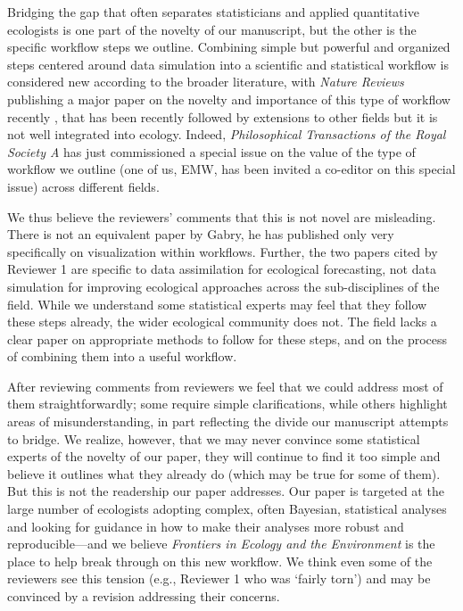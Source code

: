 \documentclass[11pt]{article}
\begin{document}
Bridging the gap that often separates statisticians and applied quantitative ecologists is one part of the novelty of our manuscript, but the other is the specific workflow steps we outline. Combining simple but powerful and organized steps centered around data simulation into a scientific and statistical workflow is considered new according to the broader literature, with \emph{Nature Reviews} publishing a major paper on the novelty and importance of this type of workflow recently \citep[this may be the Gelman publication Reviewer 3 mentions,][though the workflow we outline is distinct from this one co-authored by Gelman]{vandeschoot2021}, that has been recently followed by extensions to other fields \citep[for example in epidimeology, veterinary and cognitive sciences,][]{grinsztajn2021,schad2021,mielke2023workflow,hess2024bayesian} but it is not well integrated into ecology. Indeed, \emph{Philosophical Transactions of the Royal Society A} has just commissioned a special issue on the value of the type of workflow we outline (one of us, EMW, has been invited a co-editor on this special issue) across different fields. 

We thus believe the reviewers' comments that this is not novel are misleading. There is not an equivalent paper by Gabry, he has published only very specifically on visualization within workflows. Further, the two papers cited by Reviewer 1 are specific to data assimilation for ecological forecasting, not data simulation for improving ecological approaches across the sub-disciplines of the field. While we understand some statistical experts may feel that they follow these steps already, the wider ecological community does not. The field lacks a clear paper on appropriate methods to follow for these steps, and on the process of combining them into a useful workflow. 

After reviewing comments from reviewers we feel that we could address most of them straightforwardly; some require simple clarifications, while others highlight areas of misunderstanding, in part reflecting the divide our manuscript attempts to bridge. We realize, however, that we may never convince some statistical experts of the novelty of our paper, they will continue to find it too simple and believe it outlines what they already do (which may be true for some of them). But this is not the readership our paper addresses. Our paper is targeted at the large number of ecologists adopting complex, often Bayesian, statistical analyses and looking for guidance in how to make their analyses more robust and reproducible---and we believe \emph{Frontiers in Ecology and the Environment} is the place to help break through on this new workflow. We think even some of the reviewers see this tension (e.g., Reviewer 1 who was `fairly torn') and may be convinced by a revision addressing their concerns. 
\end{document}
